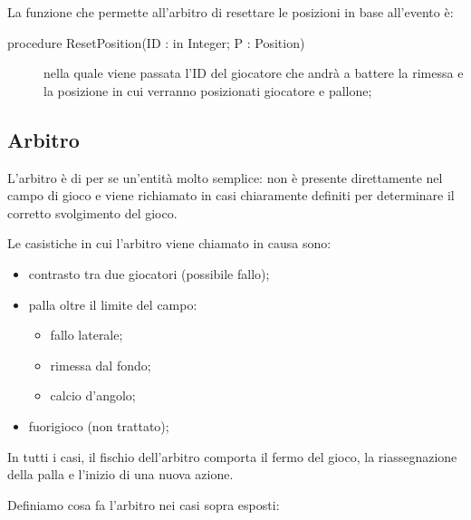 \documentclass[aps,letterpaper,10pt]{article}
\begin{document}
La funzione che permette all'arbitro di resettare le posizioni in base all'evento \`e:

\begin{description}
\item[procedure ResetPosition(ID : in Integer; P : Position)] nella quale viene passata l'ID del giocatore che andr\`a a
battere la rimessa e la posizione in cui verranno posizionati giocatore e pallone;
\end{description}

\subsection{Arbitro}
\label{arbitro}

L'arbitro \`e di per se un'entit\`a molto semplice: non \`e presente direttamente nel campo di gioco e viene richiamato
in casi chiaramente definiti per determinare il corretto svolgimento del gioco. \vspace{3mm}

Le casistiche in cui l'arbitro viene chiamato in causa sono:

\begin{itemize}
	\item contrasto tra due giocatori (possibile fallo);
	\item palla oltre il limite del campo:
	\begin{itemize}
		\item fallo laterale;
		\item rimessa dal fondo;
		\item calcio d'angolo;
	\end{itemize}
	\item fuorigioco (non trattato);
\end{itemize}

In tutti i casi, il fischio dell'arbitro comporta il fermo del gioco, la riassegnazione della palla e l'inizio di una
nuova azione. \vspace{3mm}

Definiamo cosa fa l'arbitro nei casi sopra esposti:
\end{document}
